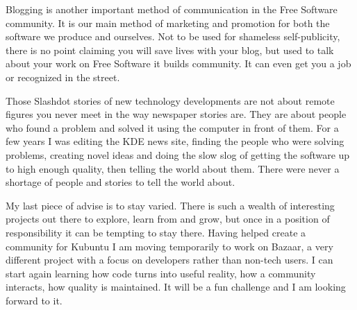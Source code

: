 Blogging is another important method of communication in the Free Software
community. It is our main method of marketing and promotion for both the
software we produce and ourselves. Not to be used for shameless self-publicity,
there is no point claiming you will save lives with your blog, but used to talk
about your work on Free Software it builds community. It can even get you a job
or recognized in the street.

Those Slashdot stories of new technology developments are not about remote
figures you never meet in the way newspaper stories are. They are about people
who found a problem and solved it using the computer in front of them. For a few
years I was editing the KDE news site, finding the people who were solving
problems, creating novel ideas and doing the slow slog of getting the software
up to high enough quality, then telling the world about them. There were never a
shortage of people and stories to tell the world about. 

My last piece of advise is to stay varied. There is such a wealth of interesting
projects out there to explore, learn from and grow, but once in a position of
responsibility it can be tempting to stay there. Having helped create a
community for Kubuntu I am moving temporarily to work on Bazaar, a very
different project with a focus on developers rather than non-tech users. I can
start again learning how code turns into useful reality, how a community
interacts, how quality is maintained. It will be a fun challenge and I am
looking forward to it.
